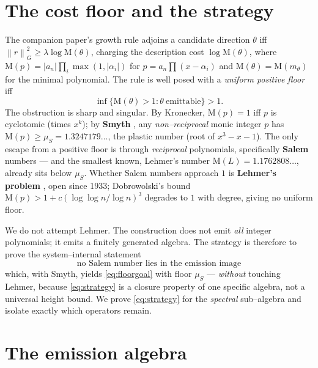 \documentclass[11pt]{article}
\theoremstyle{plain}
\theoremstyle{definition}
\theoremstyle{remark}
\newcommand{\Mah}{\mathrm{M}}
\newcommand{\norm}[1]{\left\lVert #1 \right\rVert}
\newcommand{\abs}[1]{\left\lvert #1 \right\rvert}
\begin{document}
\begin{abstract}
beyond the system, Lehmer's problem. Every non--asymptotic claim is machine--verified in exact arithmetic.
\end{abstract}

\tableofcontents

\section{The cost floor and the strategy}\label{sec:intro}

The companion paper's growth rule adjoins a candidate direction $\theta$ iff $\norm{r}_G^2\ge\lambda\log\Mah(\theta)$, charging the description cost $\log\Mah(\theta)$, where $\Mah(p)=\abs{a_n}\prod_i\max(1,\abs{\alpha_i})$ for $p=a_n\prod(x-\alpha_i)$ and $\Mah(\theta)=\Mah(m_\theta)$ for the minimal polynomial. The rule is well posed with a \emph{uniform positive floor} iff
\begin{equation}\label{eq:floorgoal}
\inf\{\Mah(\theta)>1:\theta\ \text{emittable}\}>1.
\end{equation}
The obstruction is sharp and singular. By Kronecker, $\Mah(p)=1$ iff $p$ is cyclotomic (times $x^k$); by \textbf{Smyth} \cite{Smyth}, any \emph{non--reciprocal} monic integer $p$ has $\Mah(p)\ge\mu_S=1.3247179\ldots$, the plastic number (root of $x^3-x-1$). The only escape from a positive floor is through \emph{reciprocal} polynomials, specifically \textbf{Salem} numbers --- and the smallest known, Lehmer's number $\Mah(L)=1.1762808\ldots$, already sits below $\mu_S$. Whether Salem numbers approach $1$ is \textbf{Lehmer's problem} \cite{Lehmer}, open since 1933; Dobrowolski's bound $\Mah(p)>1+c(\log\log n/\log n)^3$ \cite{Dobrowolski} degrades to $1$ with degree, giving no uniform floor.

We do not attempt Lehmer. The construction does not emit \emph{all} integer polynomials; it emits a finitely generated algebra. The strategy is therefore to prove the system--internal statement
\begin{equation}\label{eq:strategy}
\boxed{\text{no Salem number lies in the emission image}}
\end{equation}
which, with Smyth, yields \eqref{eq:floorgoal} with floor $\mu_S$ --- \emph{without} touching Lehmer, because \eqref{eq:strategy} is a closure property of one specific algebra, not a universal height bound. We prove \eqref{eq:strategy} for the \emph{spectral} sub--algebra and isolate exactly which operators remain.

\section{The emission algebra}\label{sec:algebra}
\end{document}
